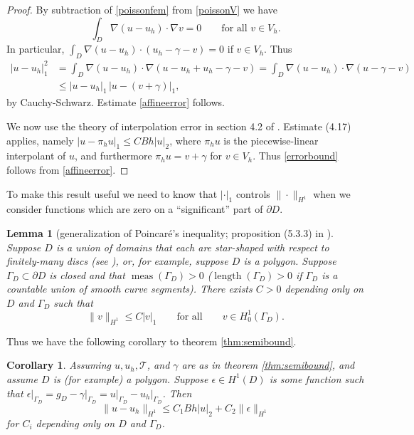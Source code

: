 \documentclass[12pt]{amsart}
\newtheorem{lem}[thm]{Lemma}
\newtheorem{cor}[thm]{Corollary}
\theoremstyle{definition}
\newcommand{\calT}{\mathcal{T}}
\newcommand{\eps}{\epsilon}
\newcommand{\grad}{\nabla}
\newcommand{\length}{\operatorname{length}}
\newcommand{\meas}{\operatorname{meas}}
\begin{document}
\begin{proof}  By subtraction of \eqref{poissonfem} from \eqref{poissonV} we have
\begin{equation}\label{erroreqn}
\int_D \grad(u-u_h)\cdot \grad v = 0 \qquad \text{for all } v\in V_h.
\end{equation}
In particular, $\int_D \grad(u-u_h)\cdot(u_h-\gamma - v) = 0$ if $v\in V_h$.  Thus
\begin{align*}
|u-u_h|_1^2 &= \int_D \grad(u-u_h)\cdot \grad(u-u_h+u_h-\gamma-v) = \int_D \grad(u-u_h)\cdot \grad(u-\gamma-v) \\
    &\le |u-u_h|_1\,|u-(v+\gamma)|_1,
\end{align*}
by Cauchy-Schwarz.  Estimate \eqref{affineerror} follows. 

We now use the theory of interpolation error in section 4.2 of \cite{Johnson}.  Estimate (4.17) applies, namely $|u-\pi_h u|_1 \le C B h |u|_2$, where $\pi_h u$ is the piecewise-linear interpolant of $u$, and furthermore $\pi_h u=v+\gamma$ for $v\in V_h$.  Thus \eqref{errorbound} follows from \eqref{affineerror}.\end{proof}

To make this result useful we need to know that $|\cdot|_1$ controls $\|\cdot\|_{H^1}$ when we consider functions which are zero on a ``significant'' part of $\partial D$.

\begin{lem}[generalization of Poincar\'e's inequality; proposition (5.3.3) in \cite{BrennerScott}] \label{lem:poin}  Suppose $D$ is a union of domains that each are star-shaped with respect to finitely-many discs (see \cite{BrennerScott}), or, for example, suppose $D$ is a polygon.  Suppose $\Gamma_D\subset\partial D$ is closed and that $\meas(\Gamma_D)>0$ (\;$\length(\Gamma_D)>0$ if $\Gamma_D$ is a countable union of smooth curve segments).  There exists $C>0$ depending only on $D$ and $\Gamma_D$ such that
    $$\|v\|_{H^1} \le C |v|_1 \qquad \text{for all} \qquad v\in H_0^1(\Gamma_D).$$ 
\end{lem}

Thus we have the following corollary to theorem \ref{thm:semibound}.

\begin{cor}\label{cor:Honebdweps}  Assuming $u,u_h,\calT$, and $\gamma$ are as in theorem \ref{thm:semibound}, and assume $D$ is (for example) a polygon.  Suppose $\eps\in H^1(D)$ is some function such that $\eps\big|_{\Gamma_D} = g_D - \gamma\big|_{\Gamma_D} = u\big|_{\Gamma_D} - u_h \big|_{\Gamma_D}$.  Then
    $$\|u-u_h\|_{H^1} \le C_1 B h |u|_2 + C_2 \|\eps\|_{H^1}$$
for $C_i$ depending only on $D$ and $\Gamma_D$.\end{cor}
\end{document}
